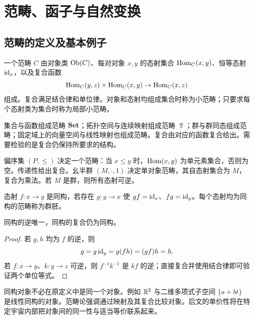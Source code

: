 \chapter{范畴、函子与自然变换}
\section{范畴的定义及基本例子}
\begin{definition}[普通范畴]
一个范畴 $C$ 由对象类 $\operatorname{Ob}(C)$、每对对象 $x,y$ 的态射集合 $\operatorname{Hom}_C(x,y)$、恒等态射 $\operatorname{id}_x$，以及复合函数
\[
\operatorname{Hom}_C(y,z)\times\operatorname{Hom}_C(x,y)\to\operatorname{Hom}_C(x,z)
\]
组成。复合满足结合律和单位律。对象和态射均组成集合时称为小范畴；只要求每个态射类为集合时称为局部小范畴。
\end{definition}
\begin{example}
集合与函数组成范畴 $\mathbf{Set}$；拓扑空间与连续映射组成范畴 $\Top$；群与群同态组成范畴；固定域上的向量空间与线性映射也组成范畴。复合由对应的函数复合给出。需要检验的是复合仍保持所要求的结构。
\end{example}
\begin{example}[偏序与幺半群]
偏序集 $(P,\le)$ 决定一个范畴：当 $x\le y$ 时，$\operatorname{Hom}(x,y)$ 为单元素集合，否则为空。传递性给出复合。幺半群 $(M,\cdot,1)$ 决定单对象范畴，其自态射集合为 $M$，复合为乘法。若 $M$ 是群，则所有态射可逆。
\end{example}
\begin{definition}[同构与群胚]
态射 $f:x\to y$ 是同构，若存在 $g:y\to x$ 使 $gf=\operatorname{id}_x$、$fg=\operatorname{id}_y$。每个态射均为同构的范畴称为群胚。
\end{definition}
\begin{lemma}
同构的逆唯一，同构的复合仍为同构。
\end{lemma}
\begin{proof}
若 $g,h$ 均为 $f$ 的逆，则
\[
g=g\operatorname{id}_y=g(fh)=(gf)h=h.
\]
若 $f:x\to y$、$k:y\to z$ 可逆，则 $f^{-1}k^{-1}$ 是 $kf$ 的逆；直接复合并使用结合律即可验证两个单位等式。
\end{proof}
\begin{remark}
同构对象不必在原定义中是同一个对象。例如 $\mathbb R^2$ 与二维多项式子空间 $\{a+bt\}$ 是线性同构的对象。范畴论强调通过映射及其复合比较对象。后文的单价性将在特定宇宙内部把对象间的同一性与适当等价联系起来。
\end{remark}

